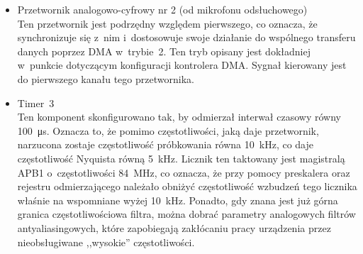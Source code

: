 \begin{itemize}
\begin{center}
\end{center}
	W~związku z~tym, przetwornik w~takiej konfiguracji mógłby efektywnie konwertować sygnały o~górnej granicznej częstotliwości widma równej \SI{250}{\kHz}. Należy jednak wziąć pod uwagę fakt, że sygnały audio słyszalne dla człowieka zawierają się w~zakresie od około \SI{20}{\Hz} do około \SI{20000}{\Hz}, co oznacza, że należy znacznie ograniczyć częstotliwość pracy układu. Dodatkowo, sygnały które zazwyczaj tłumi się aktywnie, zajmują dolną część pasma częstotliwościowego, zatem można jeszcze bardziej ograniczyć tę częstotliwość próbkowania. Ostatecznie wybrano częstotliwość próbkowania równą \SI{10}{\kHz} (okres próbkowania równy \SI{100}{\micro\s}). Takie ograniczenie osiągnięto biorąc pod uwagę czas, jaki zajmują obliczenia generujące sygnał przeciwstawny, częstotliwość wzbudzeń pochodzących od timera oraz czas konwersji DAC. Wszystkie te oraz inne czynniki składają się na zmniejszenie efektywnej zdolności przetwarzania układu. Głównym czynnikiem motywującym wybór krótkiego czasu próbkowania (zamknięcia klucza S\&H) jest konieczność zminimalizowania elektronicznego narzutu czasowego wykonanych operacji. Czas, jaki zajmą wszystkie operacje układu, nie może przekroczyć czasu, który fali akustycznej zajmuje przebycie drogi od pierwszego mikrofonu do drugiego. Przekroczenie tej granicy spowodowałoby drastyczne ograniczenie skuteczności urządzenia -- odpowiedź filtra byłaby spóźniona i~co najwyżej powielałaby hałas.
	\item Przetwornik analogowo-cyfrowy nr 2 (od mikrofonu odsłuchowego)\\
	Ten przetwornik jest podrzędny względem pierwszego, co oznacza, że synchronizuje się z~nim i~dostosowuje swoje działanie do wspólnego transferu danych poprzez DMA w~trybie~2. Ten tryb opisany jest dokładniej w~punkcie dotyczącym konfiguracji kontrolera DMA. Sygnał kierowany jest do pierwszego kanału tego przetwornika.
	\item Timer~3\\
	Ten komponent skonfigurowano tak, by odmierzał interwał czasowy równy \SI{100}{\micro\s}. Oznacza to, że pomimo częstotliwości, jaką daje przetwornik, narzucona zostaje częstotliwość próbkowania równa \SI{10}{\kHz}, co daje częstotliwość Nyquista równą \SI{5}{\kHz}. Licznik ten taktowany jest magistralą APB1 o~częstotliwości \SI{84}{\MHz}, co oznacza, że przy pomocy preskalera oraz rejestru odmierzającego należało obniżyć częstotliwość wzbudzeń tego licznika właśnie na wspomniane wyżej \SI{10}{\kHz}. Ponadto, gdy znana jest już górna granica częstotliwościowa filtra, można dobrać parametry analogowych filtrów antyaliasingowych, które zapobiegają zakłócaniu pracy urządzenia przez nieobsługiwane ,,wysokie'' częstotliwości.

\end{itemize}
